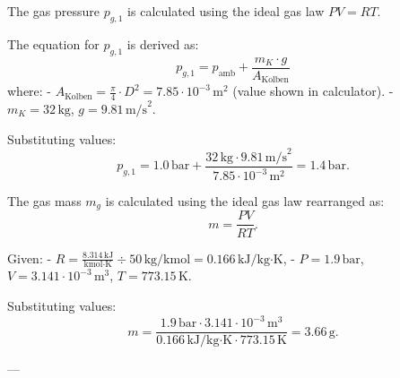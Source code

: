 The gas pressure \( p_{g,1} \) is calculated using the ideal gas law \( PV = RT \).  

The equation for \( p_{g,1} \) is derived as:  
\[
p_{g,1} = p_{\text{amb}} + \frac{m_K \cdot g}{A_{\text{Kolben}}
}
\]  
where:  
- \( A_{\text{Kolben}} = \frac{\pi}{4} \cdot D^2 = 7.85 \cdot 10^{-3} \, \text{m}^2 \) (value shown in calculator).  
- \( m_K = 32 \, \text{kg} \), \( g = 9.81 \, \text{m/s}^2 \).  

Substituting values:  
\[
p_{g,1} = 1.0 \, \text{bar} + \frac{32 \, \text{kg} \cdot 9.81 \, \text{m/s}^2}{7.85 \cdot 10^{-3} \, \text{m}^2} = 1.4 \, \text{bar}.
\]  

The gas mass \( m_g \) is calculated using the ideal gas law rearranged as:  
\[
m = \frac{PV}{RT}.
\]  

Given:  
- \( R = \frac{8.314 \, \text{kJ}}{\text{kmol·K}} \div 50 \, \text{kg/kmol} = 0.166 \, \text{kJ/kg·K} \),  
- \( P = 1.9 \, \text{bar} \), \( V = 3.141 \cdot 10^{-3} \, \text{m}^3 \), \( T = 773.15 \, \text{K} \).  

Substituting values:  
\[
m = \frac{1.9 \, \text{bar} \cdot 3.141 \cdot 10^{-3} \, \text{m}^3}{0.166 \, \text{kJ/kg·K} \cdot 773.15 \, \text{K}} = 3.66 \, \text{g}.
\]  

---